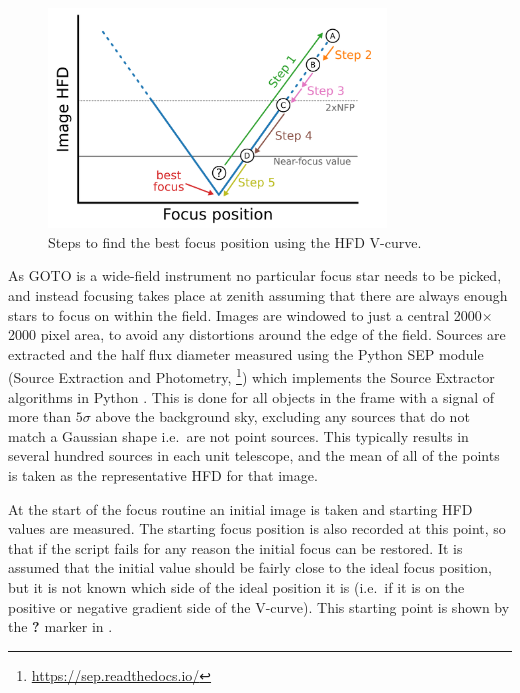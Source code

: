 \begin{colsection}
\begin{colsection}
\begin{figure}[t]
    \begin{center}
        \includegraphics[width=0.8\textwidth]{images/autofocus.pdf}
    \end{center}
    \caption[Steps to find the best focus position using the HFD V-curve]{
        Steps to find the best focus position using the HFD V-curve.
    }\label{fig:autofocus}
\end{figure}

As GOTO is a wide-field instrument no particular focus star needs to be picked, and instead focusing takes place at zenith assuming that there are always enough stars to focus on within the field. Images are windowed to just a central 2000$\times$2000 pixel area, to avoid any distortions around the edge of the field. Sources are extracted and the half flux diameter measured using the Python SEP module (Source Extraction and Photometry, \footnote{\url{https://sep.readthedocs.io/}}) which implements the Source Extractor algorithms in Python \citep{SE}. This is done for all objects in the frame with a signal of more than $5\sigma$ above the background sky, excluding any sources that do not match a Gaussian shape i.e.\ are not point sources. This typically results in several hundred sources in each unit telescope, and the mean of all of the points is taken as the representative HFD for that image.

At the start of the focus routine an initial image is taken and starting HFD values are measured. The starting focus position is also recorded at this point, so that if the script fails for any reason the initial focus can be restored. It is assumed that the initial value should be fairly close to the ideal focus position, but it is not known which side of the ideal position it is (i.e.\ if it is on the positive or negative gradient side of the V-curve). This starting point is shown by the \textbf{?} marker in .


\end{colsection}
\end{colsection}
